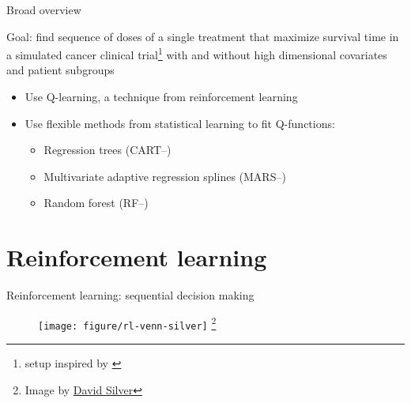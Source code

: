 \documentclass{beamer}
\newcommand\blfootnote[1]{%
  \begingroup
  \renewcommand\thefootnote{}\footnote{#1}%
  \addtocounter{footnote}{-1}%
  \endgroup
}
\begin{document}
\begin{frame}[c]{Broad overview}

Goal: find sequence of doses of a single treatment that maximize survival time in a simulated cancer clinical trial\footnote{setup inspired by \textcite{crt}} with and without high dimensional covariates and patient subgroups
\begin{itemize}[<+(1)->]
    \item Use Q-learning, a technique from reinforcement learning
    \item Use flexible methods from statistical learning to fit Q-functions: 
    \begin{itemize}[<+->]
      \item Regression trees (CART--\cite{CART})
      \item Multivariate adaptive regression splines (MARS--\cite{mars})
      \item Random forest (RF--\cite{rf})
    \end{itemize} 
\end{itemize}

\end{frame}

\section{Reinforcement learning} %
\label{sec:reinforcement_learning}

\begin{frame}[c]{Reinforcement learning: sequential decision making}
  \begin{figure}
    \centering
    \texttt{[image: figure/rl-venn-silver]}\blfootnote{\scriptsize Image by \href{http://www0.cs.ucl.ac.uk/staff/D.Silver/web/Teaching.html}{David Silver}}
  \end{figure}
\end{frame}
\end{document}
